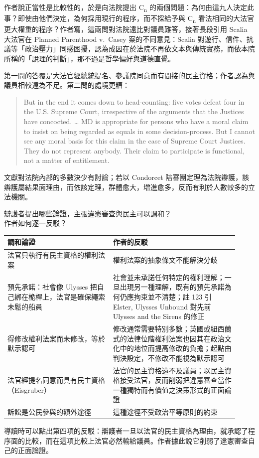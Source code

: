 作者說正當性是比較性的，於是向法院提出 C\textsubscript{n} 的兩個問題：為何由這九人決定此事？即使由他們決定，為何採用現行的程序，而不採給予與 C\textsubscript{n} 看法相同的大法官更大權重的程序？作者寫，這兩問對法院遠比對議員難答，接著長段引用 Scalia 大法官在 Planned Parenthood v.\ Casey 案的不同意見：Scalia 對遊行、信件、抗議等「政治壓力」同感困擾，認為成因在於法院不再依文本與傳統實務，而依本院所稱的「說理的判斷」，那不過是哲學偏好與道德直覺。

第一問的答覆是大法官經總統提名、參議院同意而有間接的民主資格；作者認為與議員相較遠為不足。第二問的處境更糟：

\begin{quote}
But in the end it comes down to head-counting: five votes defeat four in the U.S. Supreme Court, irrespective of the arguments that the Justices have concocted. \ldots{} MD is appropriate for persons who have a moral claim to insist on being regarded as equals in some decision-process. But I cannot see any moral basis for this claim in the case of Supreme Court Justices. They do not represent anybody. Their claim to participate is functional, not a matter of entitlement.
\end{quote}

文獻對法院內部的多數決少有討論；若以 Condorcet 陪審團定理為法院辯護，該辯護屬結果面理由，而依該定理，群體愈大，增進愈多，反而有利於人數較多的立法機關。


\begin{qaquestion}
辯護者提出哪些論證，主張違憲審查與民主可以調和？\\
作者如何逐一反駁？
\end{qaquestion}

\begin{longtable}{@{}L{0.42\linewidth}L{0.50\linewidth}@{}}
\toprule
調和論證 & 作者的反駁 \\
\midrule
\endhead
法官只執行有民主資格的權利法案 & 權利法案的抽象條文不能解決分歧 \\
預先承諾：社會像 Ulysses 把自己綁在桅桿上，法官是確保繩索未鬆的船員 & 社會並未承諾任何特定的權利理解；一旦出現另一種理解，既有的預先承諾為何仍應拘束並不清楚；註 123 引 Elster, Ulysses Unbound 對先前 Ulysses and the Sirens 的修正 \\
得修改權利法案而未修改，等於默示認可 & 修改通常需要特別多數；英國或紐西蘭式的法律位階權利法案也因其在政治文化中的地位而提高修改的負擔；起點由判決設定，不修改不能視為默示認可 \\
法官經提名同意而具有民主資格（Eisgruber） & 法官的民主資格遠不及議員；以民主資格接受法官，反而削弱把違憲審查當作一種獨特而有價值之決策形式的正面論證 \\
訴訟是公民參與的額外途徑 & 這種途徑不受政治平等原則的約束 \\
\bottomrule
\end{longtable}

\begin{readernote}
導讀時可以點出第四項的反駁：辯護者一旦以法官的民主資格為理由，就承認了程序面的比較，而在這項比較上法官必然輸給議員。作者據此說它削弱了違憲審查自己的正面論證。
\end{readernote}
